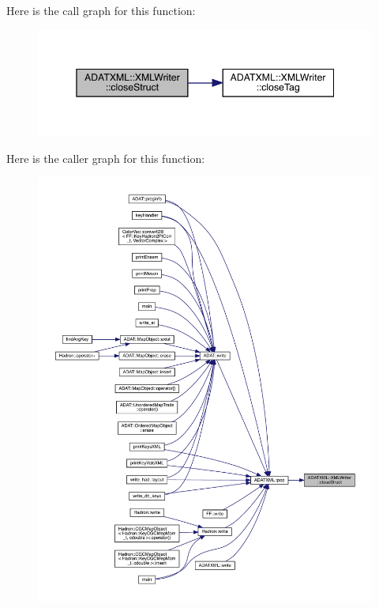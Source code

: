 Here is the call graph for this function\+:
\nopagebreak
\begin{figure}[H]
\begin{center}
\leavevmode
\includegraphics[width=345pt]{da/da7/classADATXML_1_1XMLWriter_ade5512a07806893fe3aaebb897580569_cgraph}
\end{center}
\end{figure}
Here is the caller graph for this function\+:
\nopagebreak
\begin{figure}[H]
\begin{center}
\leavevmode
\includegraphics[width=350pt]{da/da7/classADATXML_1_1XMLWriter_ade5512a07806893fe3aaebb897580569_icgraph}
\end{center}
\end{figure}
\mbox{\label{classADATXML_1_1XMLWriter_abef3ef70df40a5e9e71c99c56f133589}} 
